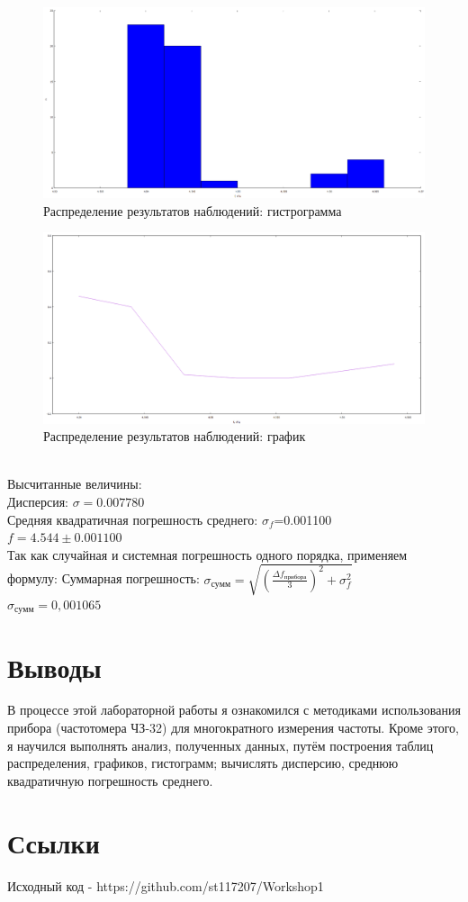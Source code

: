 \begin{figure}[H]
\centering
\includegraphics[width=1.0\textwidth]{gist}
\caption{Распределение результатов наблюдений: гистрограмма}
\label{fig:gist}
\end{figure}
\begin{figure}[H]
\centering
\includegraphics[width=1.0\textwidth]{graph3}
\caption{Распределение результатов наблюдений: график}
\label{fig:graph3}
\end{figure}\\
Высчитанные величины:\\
Дисперсия: $\sigma=0.007780$\\
Средняя квадратичная погрешность среднего: $\sigma_f$=0.001100\\
$f=4.544\pm0.001100$\\
Так как случайная и системная погрешность одного порядка, применяем формулу:
Суммарная погрешность: $\sigma_{сумм}=\sqrt{(\frac{\Delta f_{прибора}}{3})^2+\sigma_f^2}$\\
$\sigma_{сумм}=0,001065$
\section{Выводы}
В процессе этой лабораторной работы я ознакомился с методиками использования прибора (частотомера ЧЗ-32) для многократного измерения частоты. Кроме этого, я научился выполнять анализ, полученных данных, путём построения таблиц распределения, графиков, гистограмм; вычислять дисперсию, среднюю квадратичную погрешность среднего.
\section{Ссылки}
Исходный код - https://github.com/st117207/Workshop1


